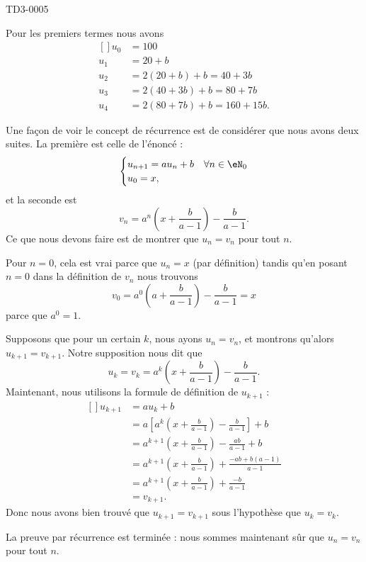 
\begin{corrige}{TD3-0005}

	Pour les premiers termes nous avons
	\begin{equation}
		\begin{aligned}[]
			u_0&=100\\
			u_1&=20+b\\
			u_2&=2(20+b)+b=40+3b\\
			u_3&=2(40+3b)+b=80+7b\\
			u_4&=2(80+7b)+b=160+15b.
		\end{aligned}
	\end{equation}
	
	Une façon de voir le concept de récurrence est de considérer que nous avons deux suites. La première est celle de l'énoncé :
	\begin{equation}
		\begin{cases}
			u_{n+1}=au_n+b	&	\text{$\forall n\in\eN_0$}\\
			u_0=x,
		\end{cases}
	\end{equation}
	et la seconde est 
	\begin{equation}
		v_n=a^n\left( x+\frac{ b }{ a-1 } \right)-\frac{ b }{ a-1 }.
	\end{equation}
	Ce que nous devons faire est de montrer que $u_n=v_n$ pour tout $n$.

	Pour $n=0$, cela est vrai parce que $u_n=x$ (par définition) tandis qu'en posant $n=0$ dans la définition de $v_n$ nous trouvons 
	\begin{equation}
		v_0=a^0\left( a+\frac{ b }{ a-1 } \right)-\frac{ b }{ a-1 }=x
	\end{equation}
	parce que $a^0=1$.

	Supposons que pour un certain $k$, nous ayons $u_n=v_n$, et montrons qu'alors $u_{k+1}=v_{k+1}$. Notre supposition nous dit que
	\begin{equation}
		u_k=v_k=a^k\left( x+\frac{ b }{ a-1 } \right)-\frac{ b }{ a-1 }.
	\end{equation}
	Maintenant, nous utilisons la formule de définition de $u_{k+1}$ :
	\begin{equation}
		\begin{aligned}[]
			u_{k+1}&=au_k+b\\
			&=a\left[ a^k\left( x+\frac{ b }{ a-1 } \right)-\frac{ b }{ a-1 } \right]+b\\
			&=a^{k+1}\left( x+\frac{ b }{ a-1 } \right)-\frac{ ab }{ a-1 }+b\\
			&=a^{k+1}\left( x+\frac{ b }{ a-1 } \right)+\frac{ -ab+b(a-1) }{ a-1 }\\
			&=a^{k+1}\left( x+\frac{ b }{ a-1 } \right)+\frac{ -b }{ a-1 }\\
			&=v_{k+1}.
		\end{aligned}
	\end{equation}
	Donc nous avons bien trouvé que $u_{k+1}=v_{k+1}$ sous l'hypothèse que $u_k=v_k$. 

	La preuve par récurrence est terminée : nous sommes maintenant sûr que $u_n=v_n$ pour tout $n$.
\end{corrige}
